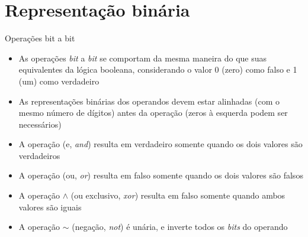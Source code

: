 \section{Representação binária}

\begin{frame}[fragile]{Operações bit a bit}

    \begin{itemize}
        \item As operações \textit{bit} a \textit{bit} se comportam da mesma maneira do que
            suas equivalentes da lógica booleana, considerando o valor 0 (zero) como falso e
            1 (um) como verdadeiro

        \item As representações binárias dos operandos devem estar alinhadas (com o mesmo número
            de dígitos) antes da operação (zeros à esquerda podem ser necessários)

        \item A operação  (e, \textit{and}) resulta em verdadeiro somente quando
            os dois valores são verdadeiros 

        \item A operação  (ou, \textit{or}) resulta em falso somente quando
            os dois valores são falsos

        \item A operação $\land$ (ou exclusivo, \textit{xor}) resulta em falso somente quando
            ambos valores são iguais

        \item A operação $\sim$ (negação, \textit{not}) é unária, e inverte todos os
            \textit{bits} do operando
    \end{itemize}

\end{frame}

